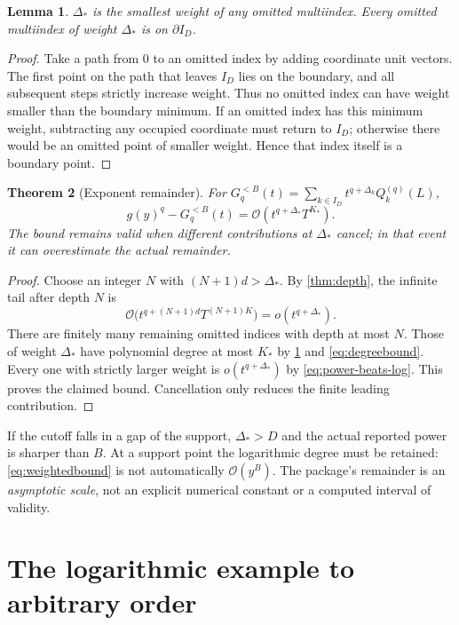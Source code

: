 \documentclass[11pt,a4paper]{article}
\newtheorem{theorem}{Theorem}[section]
\newtheorem{lemma}[theorem]{Lemma}
\theoremstyle{definition}
\theoremstyle{remark}
\newcommand{\OO}{\mathcal O}
\begin{document}
\begin{lemma}\label{lem:boundary}
$\Delta_*$ is the smallest weight of any omitted multiindex. Every omitted
multiindex of weight $\Delta_*$ is on $\partial I_D$.
\end{lemma}

\begin{proof}
Take a path from $0$ to an omitted index by adding coordinate unit vectors.
The first point on the path that leaves $I_D$ lies on the boundary, and all
subsequent steps strictly increase weight. Thus no omitted index can have
weight smaller than the boundary minimum. If an omitted index has this
minimum weight, subtracting any occupied coordinate must return to $I_D$;
otherwise there would be an omitted point of smaller weight. Hence that index
itself is a boundary point.
\end{proof}

\begin{theorem}[Exponent remainder]\label{thm:weighted}
For $G_q^{<B}(t)=\sum_{k\in I_D}t^{q+\Delta_k}Q_k^{(q)}(L)$,
\begin{equation}\label{eq:weightedbound}
 g(y)^q-G_q^{<B}(t)
 =\OO\left(t^{q+\Delta_*}T^{K_*}\right).
\end{equation}
The bound remains valid when different contributions at $\Delta_*$ cancel;
in that event it can overestimate the actual remainder.
\end{theorem}

\begin{proof}
Choose an integer $N$ with $(N+1)d>\Delta_*$. By \cref{thm:depth}, the infinite
tail after depth $N$ is
\[
 \OO\bigl(t^{q+(N+1)d}T^{(N+1)K}\bigr)
   =o(t^{q+\Delta_*}).
\]
There are finitely many remaining omitted indices with depth at most $N$.
Those of weight $\Delta_*$ have polynomial degree at most $K_*$ by
\cref{lem:boundary} and \eqref{eq:degreebound}. Every one with strictly larger
weight is $o(t^{q+\Delta_*})$ by \eqref{eq:power-beats-log}. This proves the
claimed bound. Cancellation only reduces the finite leading contribution.
\end{proof}

If the cutoff falls in a gap of the support, $\Delta_*>D$ and the actual
reported power is sharper than $B$. At a support point the logarithmic degree
must be retained: \eqref{eq:weightedbound} is not automatically
$\OO(y^B)$. The package's remainder is an \emph{asymptotic scale}, not an explicit
numerical constant or a computed interval of validity.

\section{The logarithmic example to arbitrary order}
\label{sec:logexample}
\end{document}
